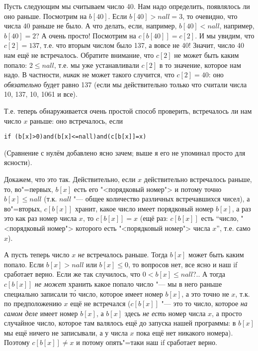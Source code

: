 Пусть следующим мы считываем число 40. Нам надо определить, появлялось ли оно раньше. Посмотрим  
на $b[40]$. Если $b[40]>nall=3$, то очевидно, что числа 40 раньше не было. А что делать, если, 
например, $b[40]<nall$, например, $b[40]=2$? А очень просто! Посмотрим на $c[b[40]]=c[2]$. И мы 
увидим, что $c[2]=137$, т.е. что вторым числом было 137, а вовсе не 40! Значит, число 40 нам ещё не 
встречалось. Обратите внимание, что $c[2]$ не может быть каким попало: $2\leq nall$, т.е. мы уже 
устанавливали $c[2]$ в то значение, которое нам надо. В частности, \textit{никак} не может такого 
случится, что $c[2]=40$: оно \textit{обязательно} будет равно 137 (если мы действительно только что 
считали числа 10, 137, 10, 1061 и все).

Т.е. теперь обнаруживается очень простой способ проверить, встречалось ли нам число $x$ раньше: 
оно встречалось, если
\begin{codesampleo}\begin{verbatim}
if (b[x]>0)and(b[x]<=nall)and(c[b[x]]=x)
\end{verbatim}
\end{codesampleo}

(Сравнение с нулём добавлено ясно зачем; выше я его не упоминал просто для ясности).

Докажем, что это так. Действительно, если $x$ действительно встречалось раньше, то, во"=первых, 
$b[x]$ есть его "<порядковый номер"> и потому точно $b[x]\leq nall$ (т.к. $nall$ "--- 
общее количество различных встречавшихся чисел), а во"=вторых, $c[b[x]]$ хранит, какое число имеет 
порядковый номер $b[x]$, а раз это как раз номер числа $x$, то $c[b[x]]=x$ (ещё раз: $c[b[x]]$ есть 
``число, "<порядковый номер"> которого есть "<порядковый номер"> числа $x$'', т.е. само $x$). 

А пусть теперь число $x$ \textit{не} встречалось раньше. Тогда $b[x]$ может быть каким попало. Если 
$b[x]>nall$ или $b[x]\leq 0$, то вопросов нет, все ясно и наш if сработает верно. Если же так случилось, что 
$0<b[x]\leq nall$?.. А тогда $c[b[x]]$ \textit{не может} хранить какое попало число "--- мы в него 
раньше специально записали т\'{о} число, которое имеет номер $b[x]$, а это точно не $x$, т.к. по 
предположению $x$ ещё не встречался ($c[b[x]]$ "--- это то число, которое \textit{на самом деле} 
имеет номер $b[x]$, а $b[x]$ здесь \textit{не есть} номер числа $x$, а просто случайное число, 
которое там валялось ещё до запуска нашей программы: в $b[x]$ мы ещё ничего не записывали, а у 
числа $x$ пока ещё нет никакого номера). Поэтому  
$c[b[x]]\neq x$ и потому опять"=таки наш if сработает верно.

